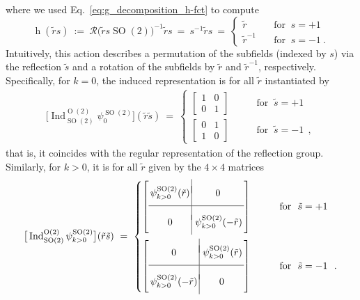 \documentclass{article}
\renewcommand{\O}[1]{\ensuremath{\operatorname{O}(#1)}}
\newcommand{\SO}[1]{\ensuremath{\operatorname{SO}(#1)}}
\newcommand{\Ind}[2]{\ensuremath{\operatorname{Ind}_{#1}^{#2}}}
\begin{document}
where we used Eq.~\ref{eq:g_decomposition_h-fct} to compute
\[
    \operatorname{h}(\tilde{r}s)
    \ :=\ \mathcal{R}\big(\tilde{r}s\SO2\big)^{-1}\tilde{r}s
    \  =\ s^{-1}\tilde{r}s
    \  =\
    \begin{cases}
        \tilde{r}       \quad&\text{for }\ s=+1 \\
        \tilde{r}^{-1}  \quad&\text{for }\ s=-1 \ .
    \end{cases}
\]
Intuitively, this action describes a permutation of the subfields (indexed by $s$) via the reflection $\tilde{s}$ and a rotation of the subfields by $\tilde{r}$ and $\tilde{r}^{-1}$, respectively.
Specifically, for $k=0$, the induced representation is for all $\tilde{r}$ instantiated by
\begin{align}
\label{eq:ind_so2_o2_trivial}
    \big[\Ind{\SO2}{\O2}\psi_0^{\SO2}\big](\tilde{r}\tilde{s})
    \ =\ 
    \begin{cases}
        \begin{bmatrix}
            1 & 0 \\
            0 & 1
        \end{bmatrix}
        \qquad&\text{for }\ \tilde{s}=+1 \\[2ex]
        \begin{bmatrix}
            0 & 1 \\
            1 & 0
        \end{bmatrix}
        \qquad&\text{for }\ \tilde{s}=-1 \ \ ,
    \end{cases}
\end{align}
that is, it coincides with the regular representation of the reflection group.
Similarly, for $k>0$, it is for all $\tilde{r}$ given by the $4\times4$ matrices
\begin{align*}
    \big[\Ind{\SO2}{\O2}\psi_{k>0}^{\SO2}\big](\tilde{r}\tilde{s})
    \ =\ 
    \begin{cases}
        \left[
        \begin{array}{c|c}
            \\[-1.75ex]
            \!\!\psi_{k>0}^{\SO2}(\tilde{r}) \!\! & 0
            \\[1.3ex]
            \hline\\[-1.2ex]
            0 & \!\psi_{k>0}^{\SO2}(-\tilde{r})\!\!\!
            \\[1.3ex]
        \end{array}
        \right]
        \qquad&\text{for }\ \tilde{s}=+1 \\[6ex]
        \left[
        \begin{array}{c|c}
            \\[-1.75ex]
            0 & \!\psi_{k>0}^{\SO2}(\tilde{r})\!\!\!
            \\[1.3ex]
            \hline\\[-1.2ex]
            \!\!\psi_{k>0}^{\SO2}(-\tilde{r})\!\! & 0
            \\[1.3ex]
        \end{array}
        \right]
        \qquad&\text{for }\ \tilde{s}=-1 \ \ .
    \end{cases}
\end{align*}
\end{document}
